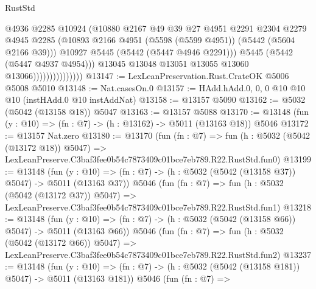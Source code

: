 \begin{lexlean}{RustStd}
\begin{coremodule}
                                    @4936
                                    @2285
                                    @10924
                                    (@10880
                                      @2167
                                      @49
                                      @39
                                      @27
                                      @4951
                                      @2291
                                      @2304
                                      @2279
                                      @4945
                                      @2285
                                      (@10893
                                        @2166
                                        @4951
                                        (@5598 (@5599 @4951))
                                        (@5442 (@5604 @2166 @39)))
                                      @10927
                                      @5445
                                      (@5442 (@5447 @4946 @2291)))
                                    @5445
                                    (@5442 (@5447 @4937 @4954)))
                                  @13045
                                  @13048
                                  @13051
                                  @13055
                                  @13060
                                  @13066)))))))))))))))
@13147 := LexLeanPreservation.Rust.CrateOK @5006 @5008 @5010
@13148 := Nat.casesOn.{0}
@13157 := HAdd.hAdd.{0, 0, 0} @10 @10 @10 (instHAdd.{0} @10 instAddNat)
@13158 := @13157 @5090
@13162 := @5032 (@5042 (@13158 @18)) @5047
@13163 := @13157 @5088
@13170 := @13148 (fun (y : @10) => (fn : @7) -> (h : @13162) -> @5011 (@13163 @18)) @5046
@13172 := @13157 Nat.zero
@13180 := @13170
    (fun (fn : @7) =>
    fun (h : @5032 (@5042 (@13172 @18)) @5047) =>
    LexLeanPreserve.C3baf3fee0b54c7873409c01bce7eb789.R22.RustStd.fun0)
@13199 := @13148
    (fun (y : @10) => (fn : @7) -> (h : @5032 (@5042 (@13158 @37)) @5047) -> @5011 (@13163 @37))
    @5046
    (fun (fn : @7) =>
    fun (h : @5032 (@5042 (@13172 @37)) @5047) =>
    LexLeanPreserve.C3baf3fee0b54c7873409c01bce7eb789.R22.RustStd.fun1)
@13218 := @13148
    (fun (y : @10) => (fn : @7) -> (h : @5032 (@5042 (@13158 @66)) @5047) -> @5011 (@13163 @66))
    @5046
    (fun (fn : @7) =>
    fun (h : @5032 (@5042 (@13172 @66)) @5047) =>
    LexLeanPreserve.C3baf3fee0b54c7873409c01bce7eb789.R22.RustStd.fun2)
@13237 := @13148
    (fun (y : @10) => (fn : @7) -> (h : @5032 (@5042 (@13158 @181)) @5047) -> @5011 (@13163 @181))
    @5046
    (fun (fn : @7) =>

\end{coremodule}
\end{lexlean}
